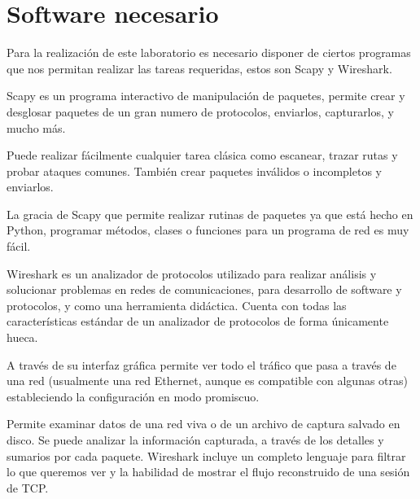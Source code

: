 \documentclass[spanish]{udpreport}
\begin{document}
\chapter{Software necesario}
\par Para la realización de este laboratorio es necesario disponer de ciertos programas que nos permitan realizar las tareas requeridas, estos son Scapy y Wireshark.
\par Scapy es un programa interactivo de manipulación de paquetes, permite crear y desglosar paquetes de un gran numero de protocolos, enviarlos, capturarlos, y mucho
más.
\par Puede realizar fácilmente cualquier tarea clásica como escanear, trazar rutas y probar ataques comunes. También crear paquetes inválidos o incompletos y enviarlos.
\par La gracia de Scapy que permite realizar rutinas de paquetes ya que está hecho en
Python, programar métodos, clases o funciones para un programa de red es muy fácil.
\par Wireshark es un analizador de protocolos utilizado para realizar análisis y solucionar problemas en redes de comunicaciones, para desarrollo de software y protocolos, y como una herramienta didáctica. Cuenta con todas las características estándar de un analizador de protocolos de forma únicamente hueca.
\par A través de su interfaz gráfica permite ver todo el tráfico que pasa a través de una red (usualmente una red Ethernet, aunque es compatible con algunas otras) estableciendo la configuración en modo promiscuo. 
\par Permite examinar datos de una red viva o de un archivo de captura salvado en disco. Se puede analizar la información capturada, a través de los detalles y sumarios por cada paquete. Wireshark incluye un completo lenguaje para filtrar lo que queremos ver y la habilidad de mostrar el flujo reconstruido de una sesión de TCP.
\end{document}
